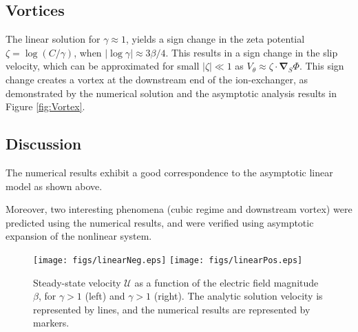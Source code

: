 \documentclass[10pt]{ijnam}
\newcommand\bnabla{\boldsymbol{\nabla}}
\newcommand\cU{\mathscr{U}}
\begin{document}
\subsection{Vortices}
The linear solution for $\gamma \approx 1$, 
yields a sign change in the zeta potential $\zeta = \log (C/\gamma)$, when
$|\log\gamma| \approx 3\beta / 4$. This results in a sign change in the slip velocity,
which can be approximated for small $|\zeta| \ll 1$ as $V_\theta \approx \zeta \cdot \bnabla_S \varPhi$.
This sign change creates a vortex at the downstream end of the ion-exchanger, 
as demonstrated by the numerical solution and the asymptotic analysis results 
in Figure \ref{fig:Vortex}.

\subsection{Discussion}
The numerical results exhibit a good correspondence to the asymptotic linear model as
shown above.

Moreover, two interesting phenomena (cubic regime and downstream vortex) were predicted
using the numerical results, and were verified using asymptotic expansion of the
nonlinear system.

\begin{figure}[htbp]
    \begin{center}
    \texttt{[image: figs/linearNeg.eps]}
    \texttt{[image: figs/linearPos.eps]}
    \caption{Steady-state velocity $\cU$ as a function of the 
        electric field magnitude $\beta$, for $\gamma > 1$ (left) 
        and $\gamma > 1$ (right). 
        The analytic solution velocity is represented by lines, and the numerical
        results are represented by markers.}
    \label{fig:Linear}
    \end{center}
\end{figure}

\begin{figure}[htbp]
\end{figure}
\end{document}
